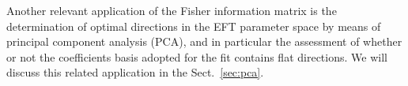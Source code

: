 Another relevant application of the Fisher information matrix is the determination
of optimal directions in the EFT parameter space by means of principal component
analysis (PCA), and in particular the assessment of whether or not the coefficients basis adopted
for the fit contains flat directions.
%
We will discuss this related application in the Sect.~\ref{sec:pca}.
